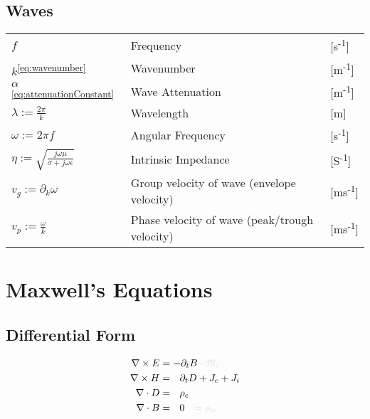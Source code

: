 \documentclass{article}
\numberwithin{equation}{section}
\begin{document}
        \subsection*{Waves}
            \begin{tabular}{ m{7em} m{24em} m{4em} }
                \( \displaystyle f \) & Frequency & [s\textsuperscript{-1}] \\
                \( \displaystyle k \)\textsuperscript{\eqref{eq:wavenumber}} &
                    Wavenumber & [m\textsuperscript{-1}]  \\
                \( \displaystyle \alpha \)\textsuperscript{\eqref{eq:attenuationConstant}}
                    & Wave Attenuation & [m\textsuperscript{-1}]  \\
                \( \displaystyle \lambda := \frac{2 \pi}{k} \) & Wavelength & [m] \\
                \( \displaystyle \omega := 2 \pi f \) & Angular Frequency &
                    [s\textsuperscript{-1}] \\
                \( \displaystyle \eta := \sqrt{\frac{j \omega \mu}{\sigma + j \omega
                    \epsilon}} \) &
                    Intrinsic Impedance & [S\textsuperscript{-1}] \\
                \( \displaystyle v_g := \partial_k \omega \) & Group velocity of wave
                    (envelope velocity) & [ms\textsuperscript{-1}]  \\
                \( \displaystyle v_p := \frac{\omega}{k} \) & Phase velocity of wave
                    (peak/trough velocity) & [ms\textsuperscript{-1}]  \\
            \end{tabular}
            \normalsize
            \newpage
    \section{Maxwell's Equations}
        \subsection{Differential Form}
            \begin{subequations}\label{eq:Maxwell}
                \begin{align}
                    \nabla \times E &= - \partial_t B \begingroup \textcolor{vanish}{
                        - \mathfrak{M}_i } \endgroup \label{eq:MaxwellFaraday} \\
                    \nabla \times H &= \ \ \partial_t D + J_{c} + J_{i} 
                        \label{eq:AmpereMaxwell} \\
                    \nabla \cdot D &= \ \ \rho_e \label{eq:GaussElectric} \\
                    \nabla \cdot B &= \ \ 0 \begingroup \textcolor{vanish}{
                        \quad = \rho_m} \endgroup \label{eq:GaussMagnetic}
                \end{align}
            \end{subequations}
\end{document}
